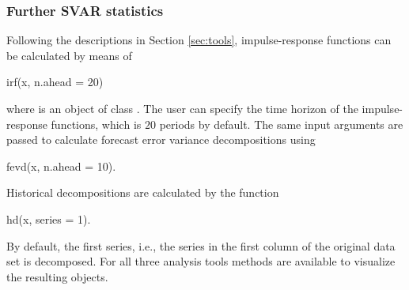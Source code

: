 \documentclass[nojss]{jss}\usepackage[]{graphicx}\usepackage[]{color}
\begin{document}
\subsubsection{Further SVAR statistics}
Following the descriptions in Section \ref{sec:tools}, impulse-response functions can be calculated by means of
 \begin{CodeChunk}
\begin{CodeInput}
irf(x, n.ahead = 20)
\end{CodeInput}
\end{CodeChunk}
where  is an object of class . The user can specify the time horizon of the impulse-response functions, which is $20$ periods by default. The same input arguments are passed to calculate forecast error variance decompositions using
\begin{CodeChunk}
\begin{CodeInput}
fevd(x, n.ahead = 10).
\end{CodeInput}
\end{CodeChunk}
Historical decompositions are calculated by the function
\begin{CodeChunk}
\begin{CodeInput}
hd(x, series = 1).
\end{CodeInput}
\end{CodeChunk}
By default, the first series, i.e., the series in the first column of the original data set is decomposed. For all three analysis tools  methods are available to visualize the resulting objects.\\
\end{document}
